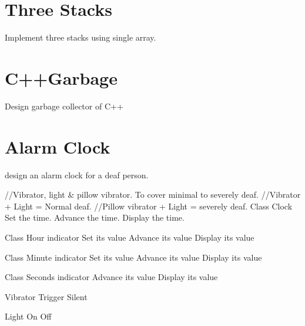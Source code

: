 \section{Three Stacks}
 Implement three stacks using single array.
 
 \section{C++Garbage}
 Design garbage collector of C++
 
 \section{Alarm Clock}
 design an alarm clock for a deaf person.
 
 \begin{Code}
 	//Vibrator, light \& pillow vibrator. To cover minimal to severely deaf. 
 	//Vibrator + Light = Normal deaf. 
 	//Pillow vibrator + Light = severely deaf.
 	Class Clock
	 	Set the time.
	 	Advance the time.
	 	Display the time.
 	
 	Class Hour indicator
	 	Set its value
	 	Advance its value
	 	Display its value
 	
 	Class Minute indicator
	 	Set its value
	 	Advance its value
	 	Display its value
 	
 	Class Seconds indicator
	 	Advance its value
	 	Display its value
 	
 	Vibrator
	 	Trigger
	 	Silent
 	
 	Light
	 	On
	 	Off
 \end{Code}